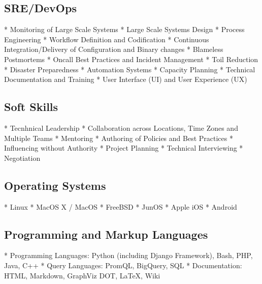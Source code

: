 \documentclass[a4paper, 11pt] {article}
\begin{document}
\subsection*{SRE/DevOps}

* Monitoring of Large Scale Systems
* Large Scale Systems Design
* Process Engineering
* Workflow Definition and Codification
* Continuous Integration/Delivery of Configuration and Binary changes
* Blameless Postmortems
* Oncall Best Practices and Incident Management
* Toil Reduction
* Disaster Preparedness
* Automation Systems
* Capacity Planning
* Technical Documentation and Training
* User Interface (UI) and User Experience (UX)

\subsection*{Soft Skills}

* Tecnhnical Leadership
* Collaboration across Locations, Time Zones and Multiple Teams
* Mentoring
* Authoring of Policies and Best Practices
* Influencing without Authority
* Project Planning
* Technical Interviewing
* Negotiation

\subsection*{Operating Systems}

* Linux
* MacOS X / MacOS
* FreeBSD
* JunOS
* Apple iOS
* Android

\subsection*{Programming and Markup Languages}

* Programming Languages: Python (including Django Framework), Bash, PHP, Java, C++
* Query Languages: PromQL, BigQuery, SQL
* Documentation: HTML, Markdown, GraphViz DOT, LaTeX, Wiki
\end{document}
